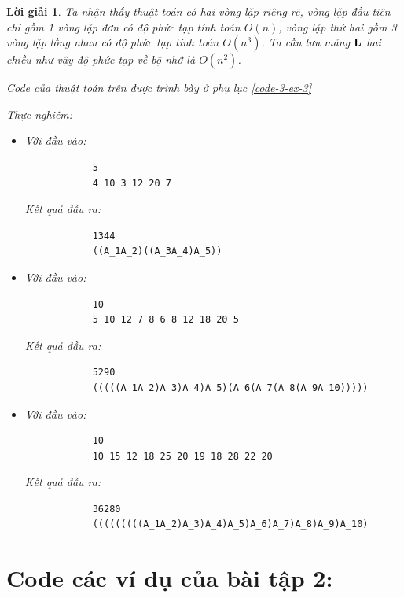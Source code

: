 \documentclass[14pt, a4paper]{article}
\theoremstyle{sltheorem}
\theoremstyle{soltheorem}
\newtheorem*{loigiai}{Lời giải}
\begin{document}
\begin{loigiai}
    Ta nhận thấy thuật toán có hai vòng lặp riêng rẽ, vòng lặp đầu tiên chỉ gồm 1 vòng lặp đơn có độ phức tạp tính toán $O(n)$,
    vòng lặp thứ hai gồm 3 vòng lặp lồng nhau có độ phức tạp tính toán $O(n^3)$. Ta cần lưu mảng $\bold{L}$ hai chiều như vậy độ phức tạp về bộ nhớ là $O(n^2)$.

    Code của thuật toán trên được trình bày ở phụ lục \ref{code-3-ex-3}

    Thực nghiệm:

    \begin{itemize}
        \item Với đầu vào:
        \begin{verbatim}
            5
            4 10 3 12 20 7
        \end{verbatim}
        Kết quả đầu ra:
        \begin{verbatim}
            1344
            ((A_1A_2)((A_3A_4)A_5))
        \end{verbatim}
        \item Với đầu vào:
        \begin{verbatim}
            10
            5 10 12 7 8 6 8 12 18 20 5
        \end{verbatim}
        Kết quả đầu ra:
        \begin{verbatim}
            5290
            (((((A_1A_2)A_3)A_4)A_5)(A_6(A_7(A_8(A_9A_10)))))
        \end{verbatim}
        \item Với đầu vào:
        \begin{verbatim}
            10
            10 15 12 18 25 20 19 18 28 22 20
        \end{verbatim}
        Kết quả đầu ra:
        \begin{verbatim}
            36280
            (((((((((A_1A_2)A_3)A_4)A_5)A_6)A_7)A_8)A_9)A_10)
        \end{verbatim}
    \end{itemize}

    \end{loigiai}

    
    \newpage
    \printbibliography[title={TÀI LIỆU THAM KHẢO}]

    \newpage

    \appendix

    \section{Code các ví dụ của bài tập 2:}
\end{document}
